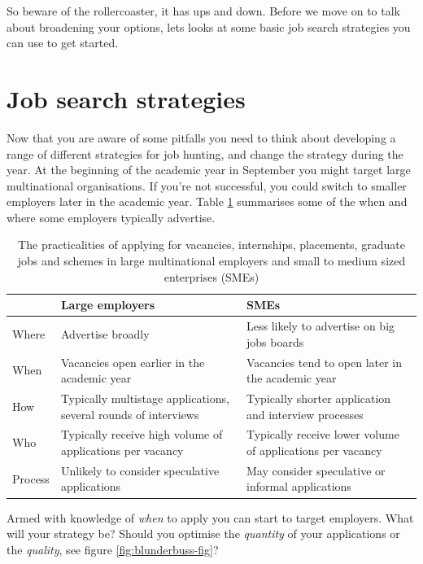 \documentclass[
]{book}
\begin{document}
So beware of the rollercoaster, it has ups and down. Before we move on to talk about broadening your options, lets looks at some basic job search strategies you can use to get started.

\hypertarget{strategies}{%
\section{Job search strategies}\label{strategies}}

Now that you are aware of some pitfalls you need to think about developing a range of different strategies for job hunting, and change the strategy during the year. At the beginning of the academic year in September you might target large multinational organisations. If you're not successful, you could switch to smaller employers later in the academic year. Table \ref{tab:shortcuts} summarises some of the when and where some employers typically advertise.

\begin{table}

\caption{\label{tab:shortcuts}The practicalities of applying for vacancies, internships, placements, graduate jobs and schemes in large multinational employers and small to medium sized enterprises (SMEs)}
\centering
\begin{tabular}[t]{lll}
\toprule
 & Large employers & SMEs\\
\midrule
Where & Advertise broadly & Less likely to advertise on big jobs boards\\
When & Vacancies open earlier in the academic year & Vacancies tend to open later in the academic year\\
How & Typically multistage applications, several rounds of interviews & Typically shorter application and interview processes\\
Who & Typically receive high volume of applications per vacancy & Typically receive lower volume of applications per vacancy\\
Process & Unlikely to consider speculative applications & May consider speculative or informal applications\\
\bottomrule
\end{tabular}
\end{table}

Armed with knowledge of \emph{when} to apply you can start to target employers. What will your strategy be? Should you optimise the \emph{quantity} of your applications or the \emph{quality}, see figure \ref{fig:blunderbuss-fig}?
\end{document}
